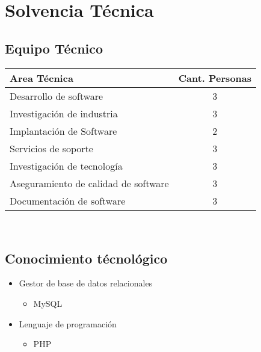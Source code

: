 \documentclass[12pt]{article}
\begin{document}
\thispagestyle{empty}


\section{Solvencia T\'ecnica}

\subsection{Equipo T\'ecnico}

\begin{tabular}{| l | c |}
\hline
Area T\'ecnica & Cant. Personas   \\
\hline
Desarrollo de software & 3 \\
\hline
Investigaci\'on de industria & 3\\
\hline
Implantaci\'on de Software & 2 \\
\hline
Servicios de soporte & 3 \\
\hline
Investigaci\'on de tecnolog\'ia & 3\\
\hline
Aseguramiento de calidad de software & 3\\
\hline
Documentaci\'on de software & 3\\
\hline
\end{tabular} \\

\subsection{Conocimiento t\'ecnol\'ogico}
\begin{itemize}
\item Gestor de base de datos relacionales
\begin{itemize}
\item MySQL
\end{itemize} 
\end{itemize}
\begin{itemize}
\item Lenguaje de programaci\'on 
\begin{itemize}
\item PHP
\end{itemize} 
\end{itemize}
\end{document}
